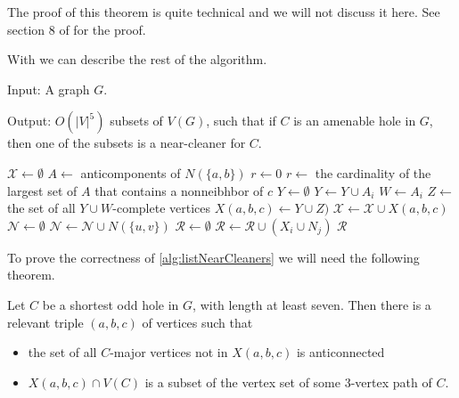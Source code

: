 The proof of this theorem is quite technical and we will not discuss it here. See section 8 of \cite{MC05} for the proof.

With  we can describe the rest of the algorithm.

\begin{alg}
	\label{alg:listNearCleaners}
	Input: A graph $G$.

	\noindent Output: $O(|V|^5)$ subsets of $V(G)$, such that if $C$ is an amenable hole in $G$, then one of the subsets is a near-cleaner for $C$.
\end{alg}

\begin{algorithmic}[1]
	\ls $\mathcal{X} \gets \emptyset$
		\ls $A \gets$ anticomponents of $N(\{a, b\})$
			\ls $r \gets 0$
		\mElse
			\ls $r \gets$ the cardinality of the largest set of $A$ that contains 
			\lsx a nonneibhbor of $c$ 
		\mEndIf
		\ls $Y \gets \emptyset$ 
				\ls $Y \gets Y \cup A_i$
			\mEndIf
				\ls $W \gets A_i$
			\mEndIf
		\mEndFor
		\ls $Z \gets$ the set of all $Y \cup W$-complete vertices
		\ls $X(a, b, c) \gets Y \cup Z)$ 
		\ls $\mathcal{X} \gets \mathcal{X} \cup X(a, b, c)$
	\mEndFor
	\ls $\mathcal{N} \gets \emptyset$
		\ls $\mathcal{N} \gets \mathcal{N} \cup N(\{u, v\})$
	\mEndFor
	\ls $\mathcal{R} \gets \emptyset$
			\ls $\mathcal{R} \gets \mathcal{R} \cup (X_i \cup N_j)$
		\mEndFor
	\mEndFor
	\ls \RETURN $\mathcal{R}$
	\mEndProcedure
\end{algorithmic}

To prove the correctness of \cref{alg:listNearCleaners} we will need the following theorem.

\begin{theorem}[9.1 of \cite{MC05}]
	\label{thm:91}
	Let $C$ be a shortest odd hole in $G$, with length at least seven. Then there is a relevant triple $(a, b, c)$ of vertices such that
	\begin{itemize}
		\item the set of all $C$-major vertices not in $X(a, b, c)$ is anticonnected
		\item $X(a, b, c) \cap V(C)$ is a subset of the vertex set of some 3-vertex path of $C$.
	\end{itemize}
\end{theorem}

